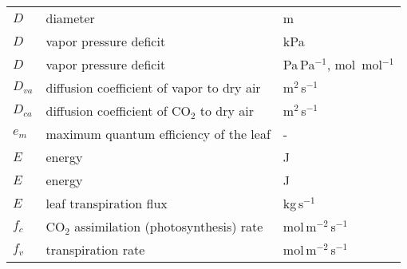 \begin{longtable}{p{}p{}p{}}
	$D$ & diameter & m \\ 
	$D$ & vapor pressure deficit & kPa\\ 	
	$D$ & vapor pressure deficit & Pa\,Pa$^{-1}$, mol~mol$^{-1}$\\ 	
	$D_{\textit{va}}$ & diffusion coefficient of vapor to dry air & m$^2$\,s$^{-1}$\\ 		
	$D_{\textit{ca}}$ & diffusion coefficient of CO$_2$ to dry air & m$^2$\,s$^{-1}$\\ 			
	$e_m$ & maximum quantum efficiency of the leaf & - \\ 
	$E$ & energy & J\\
	$E$ & energy & J\\	
	$E$ & leaf transpiration flux & kg\,s$^{-1}$ \\

	$f_c$ & CO$_2$ assimilation (photosynthesis) rate & mol\,m$^{-2}$\,s$^{-1}$ \\
	$f_v$ & transpiration rate & mol\,m$^{-2}$\,s$^{-1}$ \\	
	

\end{longtable}
